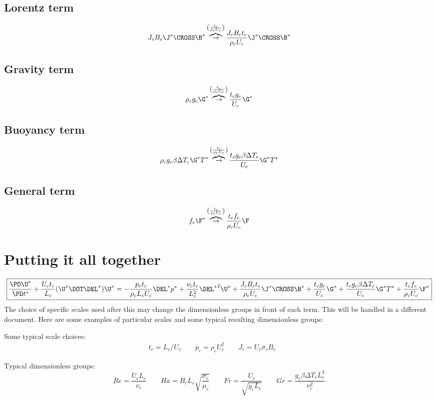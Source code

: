 \documentclass[11pt]{article}
\newcommand{\OB}{\overbrace{\rightarrow}^{\left(\frac{t_c}{\rho_c U_c}\right)}}
\begin{document}
\subsection{Lorentz term}
\begin{equation}
	J_c B_c \J^* \CROSS \B^*
	\OB
	\frac{J_c B_c t_c}{\rho_c U_c} \J^* \CROSS \B^*
\end{equation}
\subsection{Gravity term}
\begin{equation}
	\rho_c g_c \G^*
	\OB
	\frac{t_c g_c}{U_c} \G^*
\end{equation}
\subsection{Buoyancy term}
\begin{equation}
	\rho_c g_c \beta \Delta T_c \G^* T^*
	\OB
	\frac{t_c g_c \beta \Delta T_c}{U_c} \G^* T^*
\end{equation}
\subsection{General term}
\begin{equation}
	f_c \F^*
	\OB
	\frac{t_c f_c}{\rho_c U_c} \F
\end{equation}

\section{Putting it all together}

\begin{equation}
	\boxed{
	\frac{\PD \U^*}{\PD t^*}
	+ \frac{U_c t_c}{L_c} (\U^* \DOT \DEL^*) \U^* =
	- \frac{p_c t_c}{\rho_c L_c U_c} \DEL^*  p^*
	+ \frac{\nu_c t_c}{L_c^2} {\DEL^*}^2 \U^*
	+ \frac{J_c B_c t_c}{\rho_c U_c} \J^* \CROSS \B^*
	+ \frac{t_c g_c}{U_c} \G^*
	+ \frac{t_c g_c \beta \Delta T_c}{U_c} \G^* T^*
	+ \frac{t_c f_c}{\rho_c U_c} \F^*
	}
\end{equation}
The choice of specific scales used after this may change the dimensionless groups in front of each term. This will be handled in a different document. Here are some examples of particular scales and some typical resulting dimensionless groups:

Some typical scale choices:
\begin{equation}\begin{aligned}
	t_c = L_c/ U_c \qquad
	p_c = \rho_c U_c^2 \qquad
	J_c = U_c \sigma_c B_c \qquad
\end{aligned}\end{equation}

Typical dimensionless groups:
\begin{equation}
	Re = \frac{U_c L_c}{\nu_c} \qquad
	Ha = B_c L_c \sqrt{\frac{\sigma_c}{\mu_c}} \qquad
	Fr = \frac{U_c}{\sqrt{g_c L_c}} \qquad
	Gr = \frac{g_c \beta \Delta T_c L_c^3}{\nu_c^2}
\end{equation}
\end{document}
